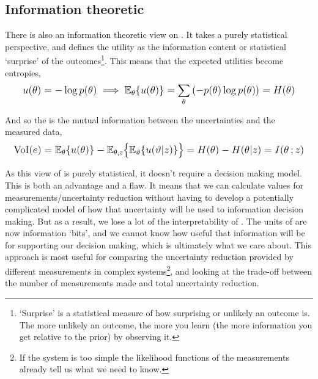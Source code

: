\subsection{Information theoretic }

There is also an information theoretic view on . It takes a purely statistical perspective, and defines the utility as the information content or statistical `surprise' of the outcomes\footnote{`Surprise' is a statistical measure of how surprising or unlikely an outcome is. The more unlikely an outcome, the more you learn (the more information you get relative to the prior) by observing it.}. This means that the expected utilities become entropies,
\begin{equation}
    \mathlarger{u(\theta) = -\log p(\theta) \implies \mathbb{E}_{\theta} \lbrace u(\theta) \rbrace = \sum_{\theta} \left( - p(\theta) \log p(\theta) \right) = H(\theta)}
\end{equation}

\noindent
And so the  is the mutual information between the uncertainties and the measured data,
\begin{equation}
    \mathlarger{\text{VoI}(e) = \mathbb{E}_{\theta} \lbrace u(\theta) \rbrace - \mathbb{E}_{\theta,z} \big\lbrace \mathbb{E}_{\vartheta} \lbrace u(\vartheta|z) \rbrace \big\rbrace = H(\theta) - H(\theta|z) = I(\theta\,;z)}
\end{equation}
\smallskip

\noindent
As this view of  is purely statistical, it doesn't require a decision making model. This is both an advantage and a flaw. It means that we can calculate  values for measurements/uncertainty reduction without having to develop a potentially complicated model of how that uncertainty will be used to information decision making. But as a result, we lose a lot of the interpretability of . The units of  are now information `bits', and we cannot know how useful that information will be for supporting our decision making, which is ultimately what we care about. This approach is most useful for comparing the uncertainty reduction provided by different measurements in complex systems\footnote{If the system is too simple the likelihood functions of the measurements already tell us what we need to know.}, and looking at the trade-off between the number of measurements made and total uncertainty reduction.\\

